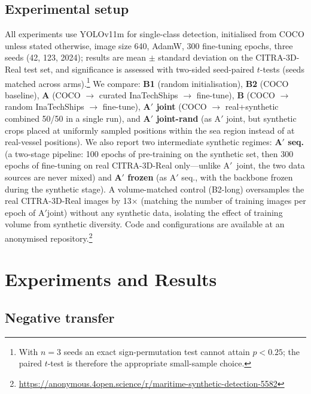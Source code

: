 \documentclass[10pt,conference]{IEEEtran}
\begin{document}
\subsection{Experimental setup}
All experiments use YOLOv11m \cite{jocher2023ultralytics} for single-class detection,
initialised from COCO unless stated otherwise, image size 640, AdamW, 300
fine-tuning epochs, three seeds (42, 123, 2024); results are mean $\pm$ standard
deviation on the CITRA-3D-Real test set, and significance is assessed with
two-sided seed-paired $t$-tests (seeds matched across
arms).\footnote{With $n{=}3$ seeds an exact sign-permutation test cannot attain
$p<0.25$; the paired $t$-test is therefore the appropriate small-sample choice.} We compare: \textbf{B1} (random
initialisation), \textbf{B2} (COCO baseline), \textbf{A} (COCO $\rightarrow$
curated InaTechShips $\rightarrow$ fine-tune), \textbf{B} (COCO $\rightarrow$
random InaTechShips $\rightarrow$ fine-tune), \textbf{A$'$ joint} (COCO $\rightarrow$
real+synthetic combined 50/50 in a single run), and \textbf{A$'$ joint-rand} (as
A$'$ joint, but synthetic crops placed at uniformly sampled positions within the
sea region instead of at real-vessel positions). We also report two intermediate
synthetic regimes: \textbf{A$'$ seq.} (a two-stage pipeline: 100 epochs of
pre-training on the synthetic set, then 300 epochs of fine-tuning on real
CITRA-3D-Real only---unlike A$'$~joint, the two data sources are never mixed)
and \textbf{A$'$ frozen} (as A$'$ seq., with the backbone frozen during the
synthetic stage). A volume-matched control (B2-long) oversamples the real CITRA-3D-Real images by 13$\times$ (matching the number of training images per epoch of A$'$joint) without any synthetic data, isolating the effect of training volume from synthetic diversity. Code and
configurations are available at an anonymised
repository.\footnote{\url{https://anonymous.4open.science/r/maritime-synthetic-detection-5582}}

\section{Experiments and Results}

\subsection{Negative transfer}
\label{subsec:negativetransfer}
\end{document}
